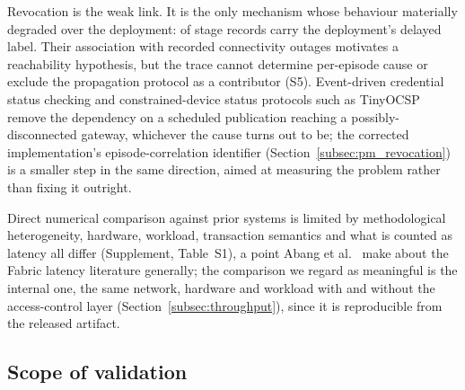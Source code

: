 \documentclass[a4paper,fleqn]{cas-sc}
\begin{document}
Revocation is the weak link. It is the only mechanism whose behaviour
materially degraded over the deployment: \RevDelayed{} of \RevEvents{}
stage records carry the deployment's delayed label. Their association with
recorded connectivity outages motivates a reachability hypothesis, but the
trace cannot determine per-episode cause or exclude the propagation
protocol as a contributor (S5). Event-driven credential status checking
\cite{w3c_vc_status_list} and constrained-device status protocols such as
TinyOCSP \cite{fedrecheski2023tinyocsp} remove the dependency on a
scheduled publication reaching a possibly-disconnected gateway, whichever
the cause turns out to be; the corrected implementation's episode-correlation identifier
(Section~\ref{subsec:pm_revocation}) is a smaller step in the same
direction, aimed at measuring the problem rather than fixing it outright.

Direct numerical comparison against prior systems is limited by
methodological heterogeneity, hardware, workload, transaction semantics
and what is counted as latency all differ (Supplement, Table~S1), a point
Abang et al.~\cite{abang2024latency} make about the Fabric latency
literature generally; the comparison we regard as meaningful is the
internal one, the same network, hardware and workload with and without
the access-control layer (Section~\ref{subsec:throughput}), since it is
reproducible from the released artifact.

\subsection{Scope of validation}
\label{subsec:notvalidated}
\end{document}

